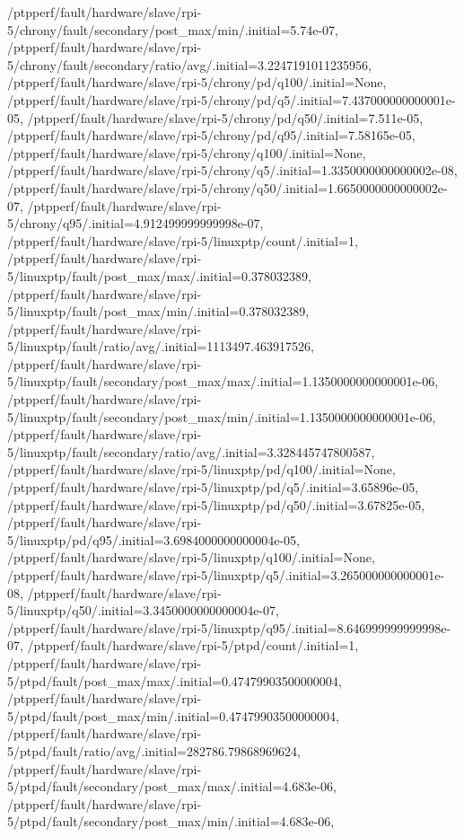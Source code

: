 {    /ptpperf/fault/hardware/slave/rpi-5/chrony/fault/secondary/post_max/min/.initial=5.74e-07,
    /ptpperf/fault/hardware/slave/rpi-5/chrony/fault/secondary/ratio/avg/.initial=3.2247191011235956,
    /ptpperf/fault/hardware/slave/rpi-5/chrony/pd/q100/.initial=None,
    /ptpperf/fault/hardware/slave/rpi-5/chrony/pd/q5/.initial=7.437000000000001e-05,
    /ptpperf/fault/hardware/slave/rpi-5/chrony/pd/q50/.initial=7.511e-05,
    /ptpperf/fault/hardware/slave/rpi-5/chrony/pd/q95/.initial=7.58165e-05,
    /ptpperf/fault/hardware/slave/rpi-5/chrony/q100/.initial=None,
    /ptpperf/fault/hardware/slave/rpi-5/chrony/q5/.initial=1.3350000000000002e-08,
    /ptpperf/fault/hardware/slave/rpi-5/chrony/q50/.initial=1.6650000000000002e-07,
    /ptpperf/fault/hardware/slave/rpi-5/chrony/q95/.initial=4.912499999999998e-07,
    /ptpperf/fault/hardware/slave/rpi-5/linuxptp/count/.initial=1,
    /ptpperf/fault/hardware/slave/rpi-5/linuxptp/fault/post_max/max/.initial=0.378032389,
    /ptpperf/fault/hardware/slave/rpi-5/linuxptp/fault/post_max/min/.initial=0.378032389,
    /ptpperf/fault/hardware/slave/rpi-5/linuxptp/fault/ratio/avg/.initial=1113497.463917526,
    /ptpperf/fault/hardware/slave/rpi-5/linuxptp/fault/secondary/post_max/max/.initial=1.1350000000000001e-06,
    /ptpperf/fault/hardware/slave/rpi-5/linuxptp/fault/secondary/post_max/min/.initial=1.1350000000000001e-06,
    /ptpperf/fault/hardware/slave/rpi-5/linuxptp/fault/secondary/ratio/avg/.initial=3.328445747800587,
    /ptpperf/fault/hardware/slave/rpi-5/linuxptp/pd/q100/.initial=None,
    /ptpperf/fault/hardware/slave/rpi-5/linuxptp/pd/q5/.initial=3.65896e-05,
    /ptpperf/fault/hardware/slave/rpi-5/linuxptp/pd/q50/.initial=3.67825e-05,
    /ptpperf/fault/hardware/slave/rpi-5/linuxptp/pd/q95/.initial=3.6984000000000004e-05,
    /ptpperf/fault/hardware/slave/rpi-5/linuxptp/q100/.initial=None,
    /ptpperf/fault/hardware/slave/rpi-5/linuxptp/q5/.initial=3.265000000000001e-08,
    /ptpperf/fault/hardware/slave/rpi-5/linuxptp/q50/.initial=3.3450000000000004e-07,
    /ptpperf/fault/hardware/slave/rpi-5/linuxptp/q95/.initial=8.646999999999998e-07,
    /ptpperf/fault/hardware/slave/rpi-5/ptpd/count/.initial=1,
    /ptpperf/fault/hardware/slave/rpi-5/ptpd/fault/post_max/max/.initial=0.47479903500000004,
    /ptpperf/fault/hardware/slave/rpi-5/ptpd/fault/post_max/min/.initial=0.47479903500000004,
    /ptpperf/fault/hardware/slave/rpi-5/ptpd/fault/ratio/avg/.initial=282786.79868969624,
    /ptpperf/fault/hardware/slave/rpi-5/ptpd/fault/secondary/post_max/max/.initial=4.683e-06,
    /ptpperf/fault/hardware/slave/rpi-5/ptpd/fault/secondary/post_max/min/.initial=4.683e-06,
}
